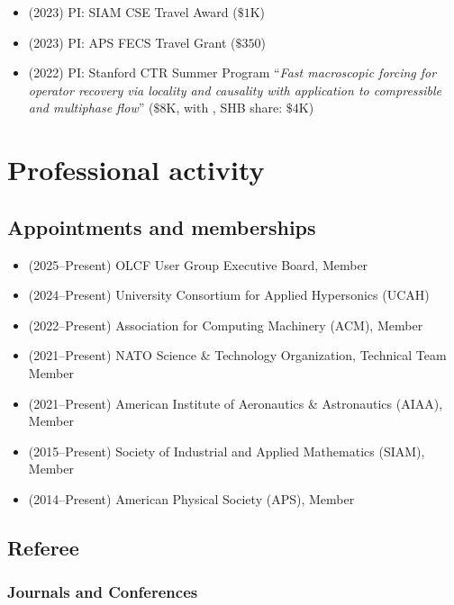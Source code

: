 \begin{itemize}
    \item (2023) PI: SIAM CSE Travel Award ($\$1$K)
    \item (2023) PI: APS FECS Travel Grant ($\$350$)
    \item (2022) PI: Stanford CTR Summer Program ``\textit{Fast macroscopic forcing for operator recovery via locality and causality with application to compressible and multiphase flow}'' ($\$8$K, with \Florian, SHB share: $\$4$K)
\end{itemize}

% 

\section{Professional activity}

\subsection{Appointments and memberships}

\begin{itemize}
    \item (2025--Present) OLCF User Group Executive Board, Member
    \item (2024--Present) University Consortium for Applied Hypersonics (UCAH)
    \item (2022--Present) Association for Computing Machinery (ACM), Member
    \item (2021--Present) NATO Science \& Technology Organization, Technical Team Member
    \item (2021--Present) American Institute of Aeronautics \& Astronautics (AIAA), Member
    \item (2015--Present) Society of Industrial and Applied Mathematics (SIAM), Member
    \item (2014--Present) American Physical Society (APS), Member
\end{itemize}

\subsection{Referee}

\subsubsection{Journals and Conferences}

